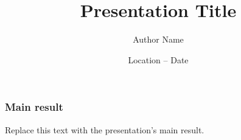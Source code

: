 \expandafter\documentclass\expandafter[\presentationclassoptions]{beamer}
\title{Presentation Title}
\author{Author Name}
\date{Location -- Date}
\begin{document}
\frame{\titlepage}

\begin{frame}
  \frametitle{Main result}
  Replace this text with the presentation's main result.
\end{frame}

\lastslide
\end{document}

